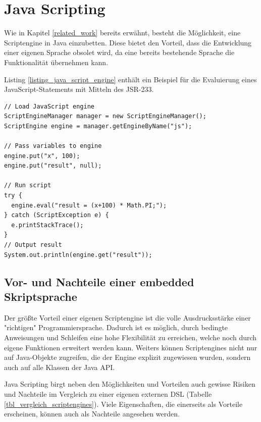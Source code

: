 \section{Java Scripting}
\label{section_java_scripting}

Wie in Kapitel \ref{related_work} bereits erwähnt, besteht die Möglichkeit, eine Scriptengine in Java einzubetten. Diese bietet den Vorteil, dass die Entwicklung einer eigenen Sprache obsolet wird, da eine bereits bestehende Sprache die Funktionalität übernehmen kann.

Listing \ref{listing_java_script_engine} enthält ein Beispiel für die Evaluierung eines JavaScript-Statements mit Mitteln des JSR-233. \\



\begin{lstlisting}[caption={Descriptive Caption Text},label=listing_java_script_engine]
// Load JavaScript engine
ScriptEngineManager manager = new ScriptEngineManager();
ScriptEngine engine = manager.getEngineByName("js");

// Pass variables to engine
engine.put("x", 100);
engine.put("result", null);

// Run script
try {
  engine.eval("result = (x+100) * Math.PI;");
} catch (ScriptException e) {
  e.printStackTrace();
}
// Output result
System.out.println(engine.get("result"));
\end{lstlisting}

\subsection{Vor- und Nachteile einer embedded Skriptsprache}

Der größte Vorteil einer eigenen Scriptengine ist die volle Ausdrucksstärke einer "richtigen" Programmiersprache. Dadurch ist es möglich, durch bedingte Anweisungen und Schleifen eine hohe Flexibilität zu erreichen, welche noch durch eigene Funktionen erweitert werden kann. Weiters können Script\-en\-gi\-nes nicht nur auf Java-Objekte zugreifen, die der Engine explizit zu\-ge\-wie\-sen wurden, sondern auch auf alle Klassen der Java API. 

Java Scripting birgt neben den Möglichkeiten und Vorteilen auch gewisse Risiken und Nachteile im Vergleich zu einer eigenen externen DSL (Tabelle \ref{tbl_vergleich_scriptengines}). Viele Eigenschaften, die einerseits als Vorteile erscheinen, können auch als Nachteile angesehen werden. 


